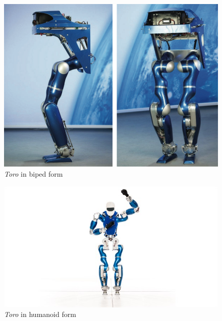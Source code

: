 \begin{figure}
	\centering
	\includegraphics[scale=0.25]{Bilder/toro-biped}
	\caption{\emph{Toro} in biped form}
	\label{fig:toro_biped}
\end{figure}
\begin{figure}
\centering
	\includegraphics[trim=40mm 0mm 40mm 0mm,clip,scale=1]{Bilder/toropic}
	\caption{\emph{Toro} in humanoid form}
	\label{fig:toro_humanoid}
\end{figure}

